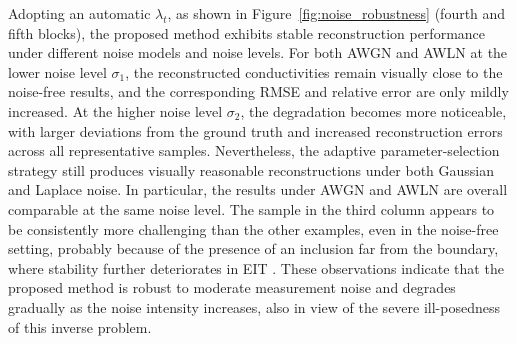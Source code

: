 \documentclass[a4paper,11pt]{article}
\theoremstyle{definition}
\theoremstyle{plain}
\theoremstyle{remark}
\begin{document}
Adopting an automatic $\lambda_t$, as shown in Figure~\ref{fig:noise_robustness} (fourth and fifth blocks), the proposed method exhibits stable reconstruction performance under different noise models and noise levels. For both AWGN and AWLN at the lower noise level $\sigma_1$, the reconstructed conductivities remain visually close to the noise-free results, and the corresponding RMSE and relative error are only mildly increased. At the higher noise level $\sigma_2$, the degradation becomes more noticeable, with larger deviations from the ground truth and increased reconstruction errors across all representative samples. Nevertheless, the adaptive parameter-selection strategy still produces visually reasonable reconstructions under both Gaussian and Laplace noise. In particular, the results under AWGN and AWLN are overall comparable at the same noise level. The sample in the third column appears to be consistently more challenging than the other examples, even in the noise-free setting, probably because of the presence of an inclusion far from the boundary, where stability further deteriorates in EIT \cite{Noser}. These observations indicate that the proposed method is robust to moderate measurement noise and degrades gradually as the noise intensity increases, also in view of the severe ill-posedness of this inverse problem.
\end{document}
